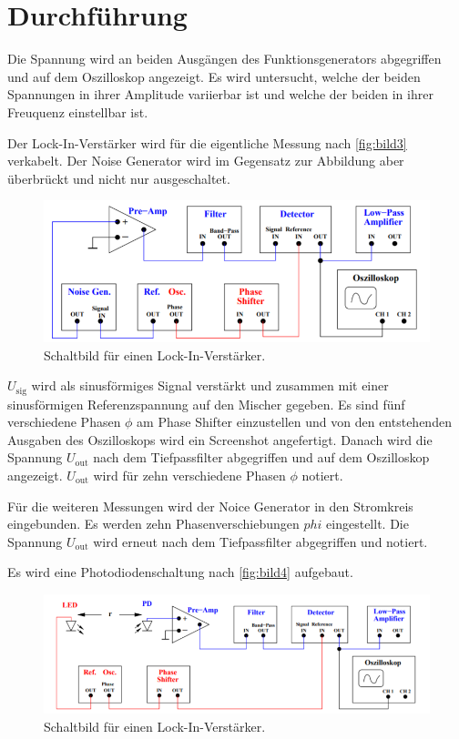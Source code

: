 \section{Durchführung}
\label{sec:Durchführung}


Die Spannung wird an beiden Ausgängen des Funktionsgenerators abgegriffen und auf dem Oszilloskop angezeigt.
Es wird untersucht, welche der beiden Spannungen in ihrer Amplitude variierbar ist und welche der beiden in ihrer Freuquenz einstellbar ist.

Der Lock-In-Verstärker wird für die eigentliche Messung nach \autoref{fig:bild3} verkabelt.
Der Noise Generator wird im Gegensatz zur Abbildung aber überbrückt und nicht nur ausgeschaltet.

\begin{figure}
    \centering
    \includegraphics[width=\textwidth/2]{images/bild3.png}
    \caption{Schaltbild für einen Lock-In-Verstärker.\cite{V303}}
    \label{fig:bild3}
\end{figure}

$U_\text{sig}$ wird als sinusförmiges Signal verstärkt und zusammen mit einer sinusförmigen Referenzspannung auf den Mischer gegeben.
Es sind fünf verschiedene Phasen $\phi$ am Phase Shifter einzustellen und von den entstehenden Ausgaben des Oszilloskops wird ein Screenshot angefertigt.
Danach wird die Spannung $U_\text{out}$ nach dem Tiefpassfilter abgegriffen und auf dem Oszilloskop angezeigt.
$U_\text{out}$ wird für zehn verschiedene Phasen $\phi$ notiert.

Für die weiteren Messungen wird der Noice Generator in den Stromkreis eingebunden. 
Es werden zehn Phasenverschiebungen $phi$ eingestellt.
Die Spannung $U_\text{out}$ wird erneut nach dem Tiefpassfilter abgegriffen und notiert.


Es wird eine Photodiodenschaltung nach \autoref{fig:bild4} aufgebaut.

\begin{figure}
    \centering
    \includegraphics[width=\textwidth/2]{images/bild4.png}
    \caption{Schaltbild für einen Lock-In-Verstärker.\cite{V303}}
    \label{fig:bild4}
\end{figure}


